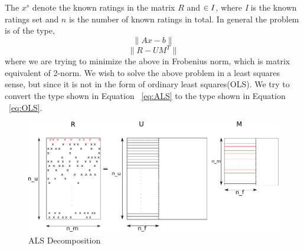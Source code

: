 The $x^s$ denote the known ratings in the matrix $R$ and $\in \emph{I}$, where
\emph{I} is the known ratings set and $n$ is the number of known ratings in
total. In general the problem is of the type, 
\begin{equation}
 \|{Ax-b}\|
 \label{eq:OLS}
\end{equation}
\begin{equation}
 \|{R-UM^T}\|
 \label{eq:ALS}
\end{equation}
where we are trying to minimize the above in Frobenius norm, which is matrix
equivalent of 2-norm. We wish to solve the above problem in a least squares
sense, but since it is not in the form of ordinary least squares(OLS). We try to
convert the type shown in Equation ~\ref{eq:ALS} to the type shown in Equation
~\ref{eq:OLS}.
\begin{figure}[h!]
\includegraphics[width=1\textwidth]{ALS_FIG.pdf}

\caption{ALS Decomposition}
\label{fig:ALS Decomposition}
\end{figure}


